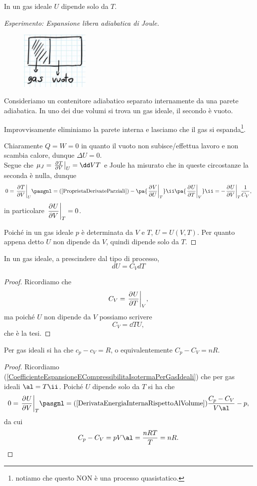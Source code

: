 \begin{fact}\label{InGasIdealeUdipendeSoloDaT}
In un gas ideale $U$ dipende solo da $T$.
\end{fact}
\begin{proof}[Esperimento: Espansione libera adiabatica di Joule]
\begin{figure}[!htb]
    \centering
    \includegraphics[width=3.3cm]{images/stato_iniziale_espansione_libera_Joule.png}
\end{figure}

\noindent
Consideriamo un contenitore adiabatico separato internamente da una parete adiabatica. In uno dei due volumi si trova un gas ideale, il secondo \`e vuoto.
\smallskip

\noindent
Improvvisamente eliminiamo la parete interna e lasciamo che il gas si espanda\footnote{notiamo che questo NON \`e una processo quasistatico.}.\smallskip

\noindent
Chiaramente $Q=W=0$ in quanto il vuoto non subisce/effettua lavoro e non scambia calore, dunque $\Delta U=0$.\\
Segue che $\mu_J=\ppb VTU=\dd VT$ e Joule ha misurato che in queste circostanze la seconda \`e nulla, dunque
\[0=\ppb VTU\pasgnl={(\ref{ProprietaDerivateParziali})}-\pa{\ppb UVT}\ii\pa{\ppb TUV}\ii=-\ppb VUT\frac1{C_V},\]
in particolare $\displaystyle\ppb VUT=0$.\medskip

\noindent Poich\'e in un gas ideale $p$ \`e determinata da $V$ e $T$, $U=U(V,T)$. Per quanto appena detto $U$ non dipende da $V$, quindi dipende solo da $T$.
\end{proof}


\begin{corollary}
In un gas ideale, a prescindere dal tipo di processo,
\[\boxed{dU=C_V dT}\]
\end{corollary}
\begin{proof}
Ricordiamo che
\[C_V=\ppb TUV,\]
ma poich\'e $U$ non dipende da $V$ possiamo scrivere
\[C_V=\dd TU,\]
che \`e la tesi.
\end{proof}

\begin{proposition}\label{RelazioneMayer}
Per gas ideali si ha che $c_p-c_V=R$, o equivalentemente $C_p-C_V=nR$.
\end{proposition}
\begin{proof}
Ricordiamo (\ref{CoefficienteEspansioneECompressibilitaIsotermaPerGasIdeali}) che per gas ideali $\al=T\ii$. Poich\'e $U$ dipende solo da $T$ si ha che
\[0=\ppb VUT\pasgnl={(\ref{DerivataEnergiaInternaRispettoAlVolume})}\frac{C_p-C_V}{V\al}-p,\]
da cui
\[C_p-C_V=pV\al=\frac{nRT}T=nR.\]
\end{proof}

